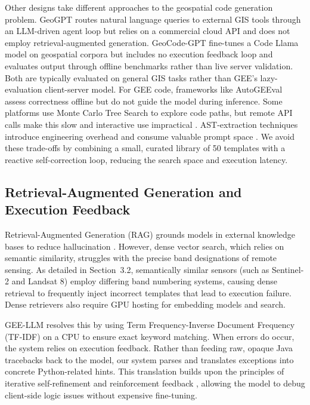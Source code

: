\documentclass[pdflatex,sn-mathphys-ay]{sn-jnl}
\begin{document}
Other designs take different approaches to the geospatial code generation problem. GeoGPT \citep{Zhang2024} routes natural language queries to external GIS tools through an LLM-driven agent loop but relies on a commercial cloud API and does not employ retrieval-augmented generation. GeoCode-GPT \citep{HouGeoCodeGPT2025} fine-tunes a Code Llama model on geospatial corpora but includes no execution feedback loop and evaluates output through offline benchmarks rather than live server validation. Both are typically evaluated on general GIS tasks rather than GEE's lazy-evaluation client-server model. For GEE code, frameworks like AutoGEEval \citep{AutoGEEval2025} assess correctness offline but do not guide the model during inference. Some platforms use Monte Carlo Tree Search to explore code paths, but remote API calls make this slow and interactive use impractical \citep{GeoAgent2024}. AST-extraction techniques introduce engineering overhead and consume valuable prompt space \citep{Hou2025}. We avoid these trade-offs by combining a small, curated library of 50 templates with a reactive self-correction loop, reducing the search space and execution latency.

\subsection{Retrieval-Augmented Generation and Execution Feedback}\label{sec:rel_rag}
Retrieval-Augmented Generation (RAG) grounds models in external knowledge bases to reduce hallucination \citep{Lewis2020, Zhou2023}. However, dense vector search, which relies on semantic similarity, struggles with the precise band designations of remote sensing. As detailed in Section~3.2, semantically similar sensors (such as Sentinel-2 and Landsat 8) employ differing band numbering systems, causing dense retrieval to frequently inject incorrect templates that lead to execution failure. Dense retrievers also require GPU hosting for embedding models and search.

GEE-LLM resolves this by using Term Frequency-Inverse Document Frequency (TF-IDF) on a CPU to ensure exact keyword matching. When errors do occur, the system relies on execution feedback. Rather than feeding raw, opaque Java tracebacks back to the model, our system parses and translates exceptions into concrete Python-related hints. This translation builds upon the principles of iterative self-refinement and reinforcement feedback \citep{Madaan2023, Shinn2023, Chen2024selfdebug}, allowing the model to debug client-side logic issues without expensive fine-tuning.
\end{document}
